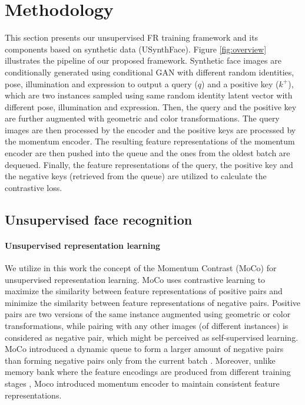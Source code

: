 \documentclass[10pt,twocolumn,letterpaper]{ieeeconf}
\begin{document}
\section{Methodology}
This section presents our unsupervised FR training framework and its components based on synthetic data (USynthFace). Figure \ref{fig:overview} illustrates the pipeline of our proposed framework. Synthetic face images are conditionally generated using conditional GAN with different random identities, pose, illumination and expression to output a query ($q$) and a positive key ($k^+$), which are two instances sampled using same random identity latent vector with different pose, illumination and expression. Then, the query and the positive key are further augmented with geometric and color transformations. The query images are then processed by the encoder and the positive keys are processed by the momentum encoder. The resulting feature representations of the momentum encoder are then pushed into the queue and the ones from the oldest batch are dequeued. Finally, the feature representations of the query, the positive key and the negative keys (retrieved from the queue) are utilized to calculate the contrastive loss.



\subsection{Unsupervised face recognition}

\paragraph{Unsupervised representation learning}




We utilize in this work the concept of the Momentum Contrast (MoCo)\cite{Moco} for unsupervised representation learning.
MoCo uses contrastive learning to maximize the similarity between feature representations of positive pairs and minimize the similarity between feature representations of negative pairs. Positive pairs are two versions of the same instance augmented using geometric or color transformations, while pairing with any other images (of different instances) is considered as negative pair, which might be perceived as self-supervised learning. MoCo introduced a dynamic queue to form a larger amount of negative pairs than forming negative pairs only from the current batch \cite{DBLP:conf/cvpr/YeZYC19,DBLP:conf/iclr/HjelmFLGBTB19}. Moreover, unlike memory bank where the feature encodings are produced from different training stages \cite{DBLP:conf/cvpr/WuXYL18}, Moco introduced momentum encoder to maintain consistent feature representations.
\end{document}
